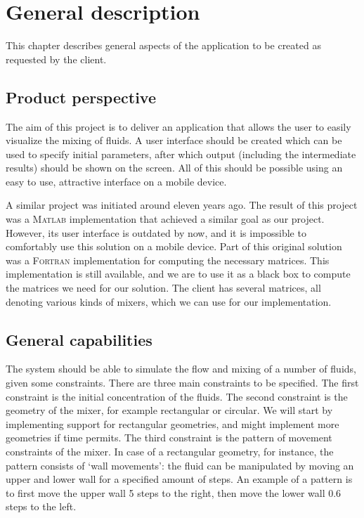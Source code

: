 \chapter{General description}
This chapter describes general aspects of the application to be created as requested by the client.

\section{Product perspective}
The aim of this project is to deliver an application that allows the user to easily visualize the mixing of fluids. A user interface should be created which can be used to specify initial parameters, after which output (including the intermediate results) should be shown on the screen. All of this should be possible using an easy to use, attractive interface on a mobile device.

A similar project was initiated around eleven years ago. The result of this project was a \textsc{Matlab} implementation that achieved a similar goal as our project. However, its user interface is outdated by now, and it is impossible to comfortably use this solution on a mobile device. Part of this original solution was a \textsc{Fortran} implementation for computing the necessary matrices. This implementation is still available, and we are to use it as a black box to compute the matrices we need for our solution. The client has several matrices, all denoting various kinds of mixers, which we can use for our implementation.

\section{General capabilities}
The system should be able to simulate the flow and mixing of a number of fluids, given some constraints. There are three main constraints to be specified. The first constraint is the initial concentration of the fluids. The second constraint is the geometry of the mixer, for example rectangular or circular. We will start by implementing support for rectangular geometries, and might implement more geometries if time permits. The third constraint is the pattern of movement constraints of the mixer. In case of a rectangular geometry, for instance, the pattern consists of `wall movements': the fluid can be manipulated by moving an upper and lower wall for a specified amount of steps. An example of a pattern is to first move the upper wall 5 steps to the right, then move the lower wall 0.6 steps to the left.

